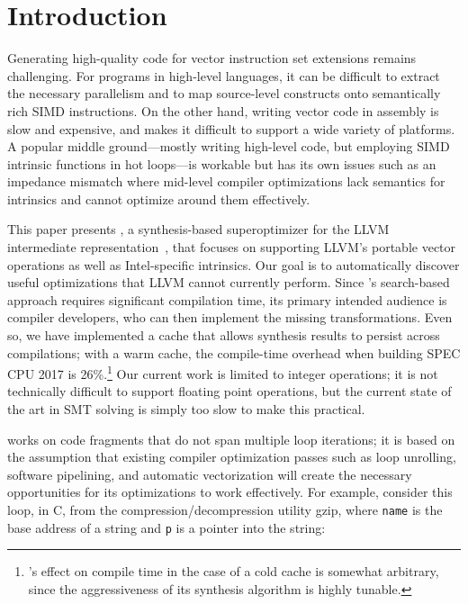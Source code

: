 \section{Introduction}

Generating high-quality code for vector instruction set extensions
remains challenging.
%
For programs in high-level languages, it can be difficult to extract
the necessary parallelism and to map source-level constructs onto
semantically rich SIMD instructions.
%
On the other hand, writing vector code in assembly is slow and
expensive, and makes it difficult to support a wide variety of
platforms.
%
A popular middle ground---mostly writing high-level code, but
employing SIMD intrinsic functions in hot loops---is workable but has
its own issues such as an impedance mismatch where mid-level compiler
optimizations lack semantics for intrinsics and cannot
optimize around them effectively.


This paper presents \tool{}, a synthesis-based superoptimizer for the
LLVM intermediate representation~\cite{LLVM:CGO04}, that focuses on
supporting LLVM's portable vector operations as well as Intel-specific
intrinsics.
%
Our goal is to automatically discover useful optimizations that LLVM
cannot currently perform.
%
Since \tool{}'s search-based approach requires significant compilation
time, its primary intended audience is compiler developers, who can
then implement the missing transformations.
%
Even so, we have implemented a cache that allows synthesis results to
persist across compilations; with a warm cache, the compile-time
overhead when building SPEC CPU 2017 is 26\%.\footnote{\tool's effect
on compile time in the case of a cold cache is somewhat arbitrary,
since the aggressiveness of its synthesis algorithm is highly tunable.}
%
Our current work is limited to integer operations; it is not
technically difficult to support floating point operations, but the
current state of the art in SMT solving is simply too slow to make
this practical.


\tool{} works on code fragments that do not span multiple loop
iterations; it is based on the assumption that existing compiler
optimization passes such as loop unrolling, software pipelining, and
automatic vectorization will create the necessary opportunities for
its optimizations to work effectively.
%
For example, consider this loop, in C, from the
compression/decompression utility gzip, where \texttt{name} is the
base address of a string and \texttt{p} is a pointer into the string:

\iffalse
\begin{verbatim}
void make_simple_name(char *name) {
  char *p = strrchr(name, '.');
  if (p == NULL) return;
  if (p == name) p++;
  do {
      if (*--p == '.') *p = '_';
  } while (p != name);
}
\end{verbatim}
\fi

